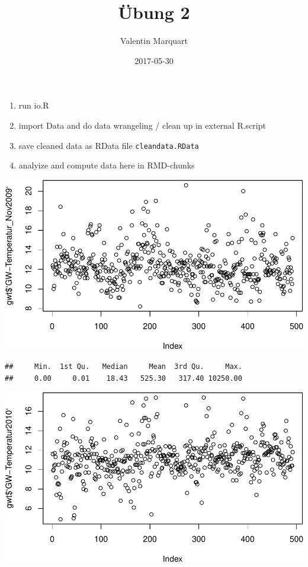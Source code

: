 \documentclass[]{article}
\title{Übung 2}
\author{Valentin Marquart}
\date{2017-05-30}
\newenvironment{Shaded}{\begin{snugshade}}{\end{snugshade}}
\newcommand{\KeywordTok}[1]{\textcolor[rgb]{0.13,0.29,0.53}{\textbf{{#1}}}}
\newcommand{\DataTypeTok}[1]{\textcolor[rgb]{0.13,0.29,0.53}{{#1}}}
\newcommand{\StringTok}[1]{\textcolor[rgb]{0.31,0.60,0.02}{{#1}}}
\newcommand{\CommentTok}[1]{\textcolor[rgb]{0.56,0.35,0.01}{\textit{{#1}}}}
\newcommand{\NormalTok}[1]{{#1}}
\begin{document}
\maketitle


\begin{enumerate}
\def\labelenumi{\arabic{enumi}.}
\itemsep1pt\parskip0pt
\item
  run io.R
\item
  import Data and do data wrangeling / clean up in external R.script
\item
  save cleaned data as RData file \texttt{cleandata.RData}
\item
  analyize and compute data here in RMD-chunks
\end{enumerate}

\includegraphics{Markdown-template_files/figure-latex/unnamed-chunk-1-1.pdf}

\begin{verbatim}
##     Min.  1st Qu.   Median     Mean  3rd Qu.     Max. 
##     0.00     0.01    18.43   525.30   317.40 10250.00
\end{verbatim}

\begin{Shaded}
\end{Shaded}

\includegraphics{Markdown-template_files/figure-latex/unnamed-chunk-2-1.pdf}
\end{document}
